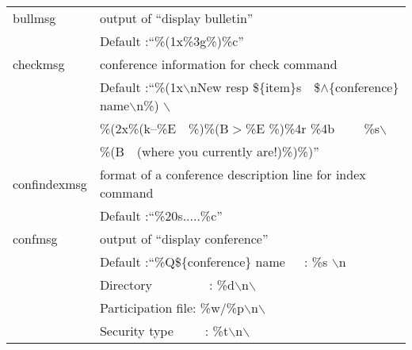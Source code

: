 \documentclass[twoside]{report}
\begin{document}
         \tablelasttail{\hline}
         \begin{supertabular}{ll}
            bullmsg  &     output of ``display bulletin''\\
               &\hspace{1cm} Default :``\%(1x\%3g\%)\%c''\\
            checkmsg  &    conference information for check command\\
               & \hspace{1cm} Default :``\%(1x$\backslash$nNew resp 
                 \$\{item\}s\ \ \$$\wedge$\{conference\} name$\backslash$n\%)
                 $\backslash$\\
               & \hspace{1cm}\%(2x\%(k--\%E\ \ \%)\%(B$>$\%E \%)\%4r \%4b
                 \ \ \ \ \%s$\backslash$ \\
               & \hspace{1cm}\%(B\ \ (where you currently are!)\%)\%)''\\
            confindexmsg & format of a conference description line for 
                           index command\\
               & \hspace{1cm} Default :``\%20s.....\%c''\\
            confmsg     &  output of ``display conference''\\
               & \hspace{1cm} Default :``\%Q\$\{conference\} name\ \ \ :
                 \%s $\backslash$n \\
               & \hspace{1cm} Directory\ \ \ \ \ \ \ \ \ : \%d$\backslash$n$
                 \backslash$\\
               & \hspace{1cm} Participation file: \%w/\%p$\backslash$n$
                 \backslash$ \\
               & \hspace{1cm} Security type\ \ \ \ \ : \%t$\backslash$n$
                 \backslash$\\

\end{supertabular}
\end{document}
